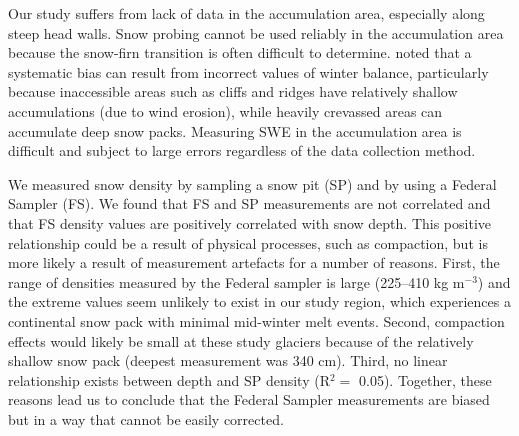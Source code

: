 \documentclass[review,oneside, letterpaper]{igs}
\begin{document}
Our study suffers from lack of data in the accumulation area, especially along steep head walls. Snow probing cannot be used reliably in the accumulation area because the snow-firn transition is often difficult to determine. \cite{Sold2013} noted that a systematic bias can result from incorrect values of winter balance, particularly because inaccessible areas such as cliffs and ridges have relatively shallow accumulations (due to wind erosion), while heavily crevassed areas can accumulate deep snow packs. Measuring SWE in the accumulation area is difficult and subject to large errors regardless of the data collection method.

We measured snow density by sampling a snow pit (SP) and by using a Federal Sampler (FS). We found that FS and SP measurements are not correlated and that FS density values are positively correlated with snow depth. This positive relationship could be a result of physical processes, such as compaction, but is more likely a result of measurement artefacts for a number of reasons. First, the range of densities measured by the Federal sampler is large (225--410 kg m$^{-3}$) and the extreme values seem unlikely to exist in our study region, which experiences a continental snow pack with minimal mid-winter melt events. Second, compaction effects would likely be small at these study glaciers because of the relatively shallow snow pack (deepest measurement was 340 cm). Third, no linear relationship exists between depth and SP density (R$^2=$ 0.05). Together, these reasons lead us to conclude that the Federal Sampler measurements are biased but in a way that cannot be easily corrected. 
\end{document}

